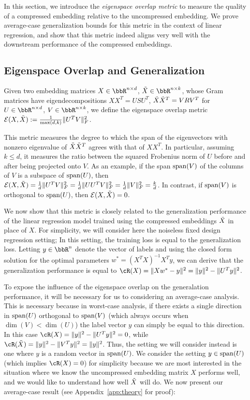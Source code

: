 In this section, we introduce the \textit{eigenspace overlap metric} to measure the quality of a compressed embedding relative to the uncompressed embedding.
We prove average-case generalization bounds for this metric in the context of linear regression, and show that this metric indeed aligns very well with the downstream performance of the compressed embeddings.

\subsection{Eigenspace Overlap and Generalization}
\label{subsec:eigen_overlap}
\begin{definition}
Given two embedding matrices $X \in \RR^{n \times d}$, $\tX \in \RR^{n \times k}$, whose Gram matrices have eigendecompositions $XX^T = USU^T$, $\tX\tX^T = VRV^T$ for $U \in \RR^{n\times d}$, $V\in \RR^{n \times k}$, we define the eigenspace overlap metric $\eigover(X,\tX) \defeq  \frac{1}{\max(d,k)}\|U^T V\|_F^2$.
\end{definition}

This metric measures the degree to which the span of the eigenvectors with nonzero eigenvalue of $\tX\tX^T$ agrees with that of $XX^T$.
In particular, assuming $k\leq d$, it measures the ratio between the squared Frobenius norm of $U$ before and after being projected onto $V$.
As an example, if the span $\Span(V)$ of the columns of $V$ is a subspace of $\Span(U)$, then $\eigover(X,\tX) = \frac{1}{d}\|U^T V\|_F^2 = \frac{1}{d}\|UU^T V\|_F^2 = \frac{1}{d}\|V\|_F^2 = \frac{k}{d}$.
In contrast, if $\Span(V)$ is orthogonal to $\Span(U)$, then $\eigover(X,\tX) = 0$.

We now show that this metric is closely related to the generalization performance of the linear regression model trained using the compressed embeddings $\tX$ in place of $X$.
For simplicity, we will consider here the noiseless fixed design regression setting;
In this setting, the training loss is equal to the generalization loss.
Letting $y\in\RR^n$ denote the vector of labels and using the closed form solution for the optimal parameters $w^* = (X^T X)^{-1}X^Ty$, we can derive that the generalization performance is equal to $\cR(X) = \|Xw^* - y\|^2 = \|y\|^2 - \|U^T y\|^2$.

To expose the influence of the eigenspace overlap on the generalation performance, it will be necessary for us to considering an average-case analysis.
This is necessary because in worst-case analysis, if there exists a single direction in $\Span(U)$ orthogonal to $\Span(V)$ (which always occurs when $\dim(V) < \dim(U)$) the label vector $y$ can simply be equal to this direction.
In this case $\cR(X) = \|y\|^2 - \|U^T y\|^2 = 0$, while $\cR(\tX) = \|y\|^2 - \|V^T y\|^2 = \|y\|^2$.
Thus, the setting we will consider instead is one where $y$ is a random vector in $\Span(U)$.
We consider the setting $y \in \Span(U)$ (which implies $\cR(X) = 0$) for simplicity because we are most interested in the situation where we know the uncompressed embedding matrix $X$ performs well, and we would like to understand how well $\tX$ will do.
We now present our average-case result (see Appendix~\ref{app:theory} for proof):

